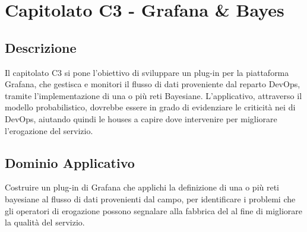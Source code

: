 \clearpage
\section{Capitolato C3 - Grafana \& Bayes}
\subsection{Descrizione}
Il capitolato C3 si pone l'obiettivo di sviluppare un plug-in per la piattaforma Grafana, che gestisca e monitori il flusso di dati proveniente dal reparto DevOps, tramite l'implementazione di una o più reti Bayesiane. 
L'applicativo, attraverso il modello probabilistico, dovrebbe essere in grado di evidenziare le criticità nei  di DevOps, aiutando quindi le  houses a capire dove intervenire per migliorare l'erogazione del servizio.

\subsection{Dominio Applicativo}
Costruire un plug-in di Grafana che applichi la definizione di una o più reti bayesiane al flusso di dati provenienti dal campo, per identificare i problemi che gli operatori di erogazione possono segnalare alla fabbrica del  al fine di migliorare la qualità del servizio.

